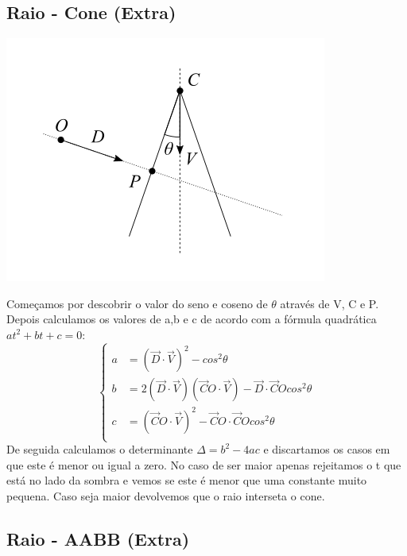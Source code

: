 \documentclass{article}
\begin{document}
    \subsection*{Raio - Cone (Extra)}
        \begin{center}
            \includegraphics[scale=0.60]{cone}
        \end{center}
        \par
        Começamos por descobrir o valor do seno e coseno de $ \theta $ através de V, C e P. Depois calculamos os valores de a,b e c de acordo com a fórmula quadrática
        $ at^2 + bt + c = 0 $:
        \begin{equation*}
            \begin{cases}
                a &= (\overrightarrow{D} \cdot \overrightarrow{V})^2 - cos^2 \theta \\
                b &= 2(\overrightarrow{D} \cdot \overrightarrow{V})(\overrightarrow{C}O \cdot \overrightarrow{V}) - \overrightarrow{D} \cdot \overrightarrow{C}O cos^2 \theta \\
                c &= (\overrightarrow{C}O \cdot \overrightarrow{V})^2 - \overrightarrow{C}O \cdot \overrightarrow{C}O cos^2 \theta \\
            \end{cases}
        \end{equation*}
        De seguida calculamos o determinante $\Delta = b^2 - 4ac$ e discartamos os casos em que este é menor ou igual a zero. No caso de ser maior apenas 
        rejeitamos o t que está no lado da sombra e vemos se este é menor que uma constante muito pequena. Caso seja maior devolvemos que o raio interseta o cone.
    \subsection*{Raio - AABB (Extra)}
\end{document}
